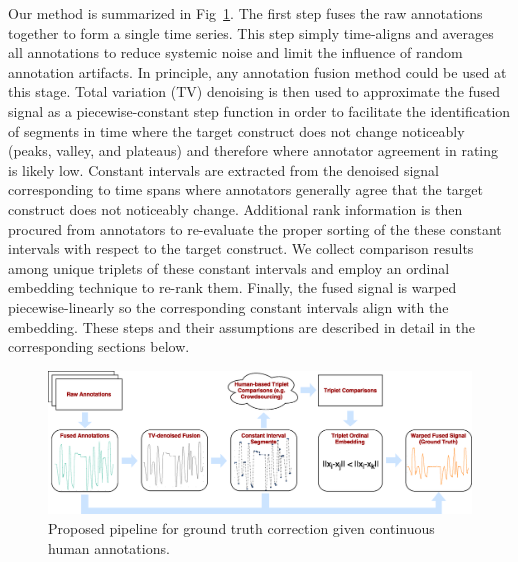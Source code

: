 \documentclass[10pt,letterpaper]{article}
\def \imagewidth {7.5in}
\begin{document}
Our method is summarized in Fig~\ref{Fig:pipeline}.  The first step fuses the raw annotations together to form a single time series.  This step simply time-aligns and averages all annotations to reduce systemic noise and limit the influence of random annotation artifacts.  In principle, any annotation fusion method could be used at this stage.  Total variation (TV) denoising is then used to approximate the fused signal as a piecewise-constant step function in order to facilitate the identification of segments in time where the target construct does not change noticeably (peaks, valley, and plateaus) and therefore where annotator agreement in rating is likely low.  Constant intervals are extracted from the denoised signal corresponding to time spans where annotators generally agree that the target construct does not noticeably change.  Additional rank information is then procured from annotators to re-evaluate the proper sorting of the these constant intervals with respect to the target construct.  We collect comparison results among unique triplets of these constant intervals and employ an ordinal embedding technique to re-rank them.  Finally, the fused signal is warped piecewise-linearly so the corresponding constant intervals align with the embedding.  These steps and their assumptions are described in detail in the corresponding sections below.

\begin{figure}[t]
    \begin{adjustwidth}{-2.25in}{0in}
	\centering
	\includegraphics[width=\imagewidth]{images/Fig3.eps}
	\vspace{0.5em}
	\caption{Proposed pipeline for ground truth correction given continuous human annotations.}
	\label{Fig:pipeline}
	\end{adjustwidth}
\end{figure}

\end{document}
